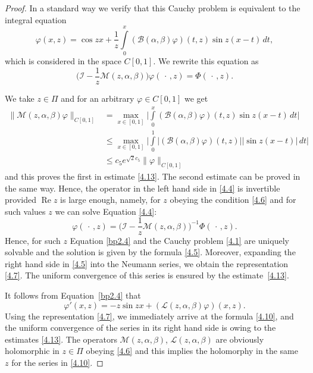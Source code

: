 \documentclass[10pt, a4paper]{article}
\theoremstyle{plain}
\theoremstyle{definition}
\numberwithin{equation}{section}
\def\cL{\mathcal{L}}
\def\cI{\mathcal{I}}
\DeclareMathOperator{\RE}{Re}
\begin{document}
\begin{proof}
In a standard way we verify that this Cauchy problem is equivalent to the integral equation
\begin{equation}\label{bp2.4}
\varphi(x, z) = \cos zx+\frac{1}{z}\int\limits_0^{x}(\mathcal{B}(\alpha, \beta)\varphi)(t, z)\sin z(x-t)\,dt,
\end{equation}
which is considered in the space $C[0, 1]$. We rewrite this equation as
\begin{equation}\label{4.4}
\Big(\cI-\frac{1}{z}\mathcal{M}(z,\alpha, \beta)\Big)\varphi(\,\cdot\,, z)=\Phi(\,\cdot\,,z).
\end{equation}

We take $z\in\Pi$ and for an arbitrary $\varphi\in C[0,1]$ we get
\begin{align*}
\|\mathcal{M}(z,\alpha, \beta)\varphi\|_{C[0, 1]} &=
\max\limits_{x\in [0, 1]}\bigg|\int\limits_0^x(\mathcal{B}(\alpha, \beta)\varphi)(t,z)\sin z(x-t)\,dt\bigg| \\
&\leqslant \max\limits_{x\in [0, 1]}\bigg|\int\limits_0^1 |(\mathcal{B}(\alpha, \beta)\varphi)(t, z)||\sin z(x-t)|\,dt\bigg|\\
&\leqslant c_{5} e^{\sqrt{2}c_{5}}\|\varphi\|_{C[0,1]}
\end{align*}
and this proves the first in estimate \eqref{4.13}. The second estimate can be proved in the same way. Hence,
the operator in the left hand side in \eqref{4.4} is invertible provided $\RE z$ is large enough, namely, for
$z$ obeying the condition \eqref{4.6} and for such values $z$ we can solve Equation \eqref{4.4}:
\begin{equation}\label{4.5}
\varphi(\,\cdot\,, z)=\Big(\mathcal{I}-\frac{1}{z}\mathcal{M}(z,\alpha, \beta)\Big)^{-1}\Phi(\,\cdot\,,z).
\end{equation}
Hence, for such $z$ Equation \eqref{bp2.4} and the Cauchy problem \eqref{4.1} are uniquely solvable and the
solution is given by the formula \eqref{4.5}. Moreover, expanding the right hand side in \eqref{4.5} into the Neumann series,
we obtain the representation \eqref{4.7}. The uniform convergence of this series is ensured by the estimate~\eqref{4.13}.

It follows from Equation~\eqref{bp2.4} that
\begin{equation*}%
\varphi'(x, z) = -z\sin zx+(\cL(z,\alpha, \beta) \varphi)(x, z).
\end{equation*}
Using the representation \eqref{4.7}, we immediately arrive at the formula \eqref{4.10}, and the uniform convergence
of the series in its right hand side is owing to the estimates \eqref{4.13}. The operators $\mathcal{M}(z,\alpha, \beta)$,
$\cL(z,\alpha, \beta)$ are obviously holomorphic in $z\in\Pi$ obeying \eqref{4.6} and this implies the
holomorphy in the same $z$ for the series in \eqref{4.10}.


\end{proof}
\end{document}
